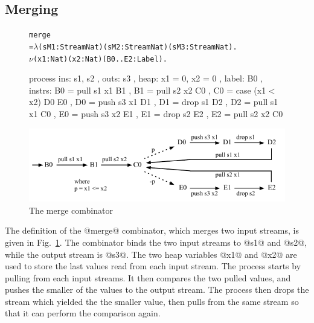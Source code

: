 \subsection{Merging}
\begin{figure}
\begin{alltt}
               merge
                 = \(\lambda\) (sM1: Stream Nat) (sM2: Stream Nat) (sM3: Stream Nat). 
                   \(\nu\) (x1: Nat) (x2: Nat) (B0..E2: Label).
\end{alltt}
\begin{code}
                   process
                   { ins:    { s1, s2 }
                   , outs:   { s3 }
                   , heap:   { x1 = 0, x2 = 0 }
                   , label:  B0
                   , instrs: { B0 = pull s1 x1     B1 {}
                             , B1 = pull s2 x2     C0 {}
                             , C0 = case (x1 < x2) D0 {}  E0 {}
                             , D0 = push s3 x1     D1 {}
                             , D1 = drop s1        D2 {}
                             , D2 = pull s1 x1     C0 {}
                             , E0 = push s3 x2     E1 {}
                             , E1 = drop s2        E2 {}
                             , E2 = pull s2 x2     C0 {} } }
\end{code}

\medskip
\includegraphics[scale=1.1]{figures/state-merge.pdf}
\caption{The merge combinator}
\label{fig:Process:Merge}
\end{figure}

The definition of the @merge@ combinator, which merges two input streams, is given in Fig.~\ref{fig:Process:Merge}. The combinator binds the two input streams to @s1@ and @s2@, while the output stream is @s3@. The two heap variables @x1@ and @x2@ are used to store the last values read from each input stream. The process starts by pulling from each input streams. It then compares the two pulled values, and pushes the smaller of the values to the output stream. The process then drops the stream which yielded the the smaller value, then pulls from the same stream so that it can perform the comparison again.

